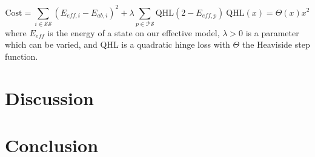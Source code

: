 \documentclass{article}
\begin{document}
\begin{equation}
\text{Cost} = \sum_{i \in \mathcal{SS}} (E_{eff,i} - E_{ab, i})^2 + \lambda \sum_{p \in \mathcal{PS}} \text{QHL}(2 - E_{eff,p})\ \text{QHL}(x) = \Theta(x)x^2
\end{equation}
where $E_{eff}$ is the energy of a state on our effective model, $\lambda>0$ is a parameter which can be varied, and QHL is a quadratic hinge loss with $\Theta$ the Heaviside step function. 
\section{Discussion}


\section{Conclusion}
\end{document}
